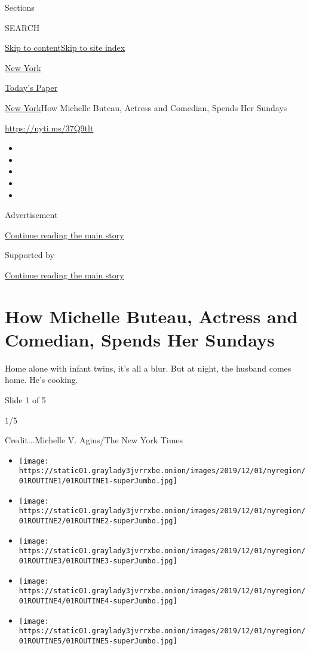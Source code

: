 Sections

SEARCH

\protect\hyperlink{site-content}{Skip to
content}\protect\hyperlink{site-index}{Skip to site index}

\href{https://www.nytimes3xbfgragh.onion/section/nyregion}{New York}

\href{https://myaccount.nytimes3xbfgragh.onion/auth/login?response_type=cookie\&client_id=vi}{}

\href{https://www.nytimes3xbfgragh.onion/section/todayspaper}{Today's
Paper}

\href{/section/nyregion}{New York}\textbar{}How Michelle Buteau, Actress
and Comedian, Spends Her Sundays

\url{https://nyti.ms/37Q9tlt}

\begin{itemize}
\item
\item
\item
\item
\item
\end{itemize}

Advertisement

\protect\hyperlink{after-top}{Continue reading the main story}

Supported by

\protect\hyperlink{after-sponsor}{Continue reading the main story}

\hypertarget{how-michelle-buteau-actress-and-comedian-spends-her-sundays}{%
\section{How Michelle Buteau, Actress and Comedian, Spends Her
Sundays}\label{how-michelle-buteau-actress-and-comedian-spends-her-sundays}}

Home alone with infant twins, it's all a blur. But at night, the husband
comes home. He's cooking.

Slide 1 of 5

1/5

Credit...Michelle V. Agins/The New York Times

\begin{itemize}
\item
  \texttt{[image: https://static01.graylady3jvrrxbe.onion/images/2019/12/01/nyregion/01ROUTINE1/01ROUTINE1-superJumbo.jpg]}
\item
  \texttt{[image: https://static01.graylady3jvrrxbe.onion/images/2019/12/01/nyregion/01ROUTINE2/01ROUTINE2-superJumbo.jpg]}
\item
  \texttt{[image: https://static01.graylady3jvrrxbe.onion/images/2019/12/01/nyregion/01ROUTINE3/01ROUTINE3-superJumbo.jpg]}
\item
  \texttt{[image: https://static01.graylady3jvrrxbe.onion/images/2019/12/01/nyregion/01ROUTINE4/01ROUTINE4-superJumbo.jpg]}
\item
  \texttt{[image: https://static01.graylady3jvrrxbe.onion/images/2019/12/01/nyregion/01ROUTINE5/01ROUTINE5-superJumbo.jpg]}
\end{itemize}

